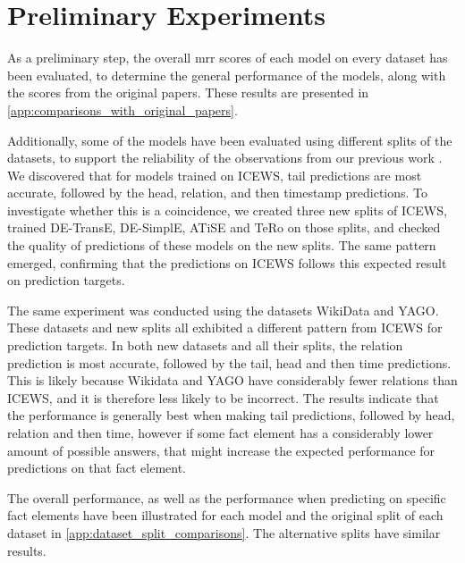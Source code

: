\section{Preliminary Experiments}
\label{sec:preliminary_experiments}

As a preliminary step, the overall \gls{mrr} scores of each model on every dataset has been evaluated, to determine the general performance of the models, along with the scores from the original papers. These results are presented in \autoref{app:comparisons_with_original_papers}. 

Additionally, some of the models have been evaluated using different splits of the datasets, to support the reliability of the observations from our previous work \cite{P9}. We discovered that for models trained on ICEWS, tail predictions are most accurate, followed by the head, relation, and then timestamp predictions. To investigate whether this is a coincidence, we created three new splits of ICEWS, trained DE-TransE, DE-SimplE, ATiSE and TeRo on those splits, and checked the quality of predictions of these models on the new splits. The same pattern emerged, confirming that the predictions on ICEWS follows this expected result on prediction targets.

The same experiment was conducted using the datasets WikiData and YAGO. These datasets and new splits all exhibited a different pattern from ICEWS for prediction targets. In both new datasets and all their splits, the relation prediction is most accurate, followed by the tail, head and then time predictions.
This is likely because Wikidata and YAGO have considerably fewer relations than ICEWS, and it is therefore less likely to be incorrect. The results indicate that the performance is generally best when making tail predictions, followed by head, relation and then time, however if some fact element has a considerably lower amount of possible answers, that might increase the expected performance for predictions on that fact element.

The overall performance, as well as the performance when predicting on specific fact elements have been illustrated for each model and the original split of each dataset in \autoref{app:dataset_split_comparisons}. The alternative splits have similar results.

%

